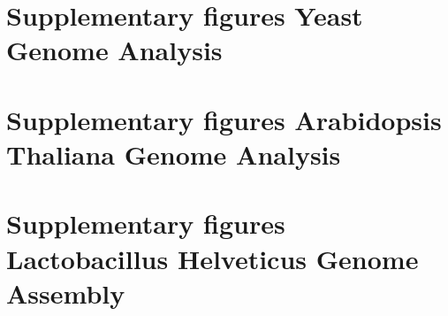 \documentclass[10pt,a4paper]{article}
\begin{document}

\newpage
{}


\appendix
\section{Supplementary figures Yeast Genome Analysis}


\section{Supplementary figures Arabidopsis Thaliana Genome Analysis}


\section{Supplementary figures Lactobacillus Helveticus Genome Assembly}
\end{document}
